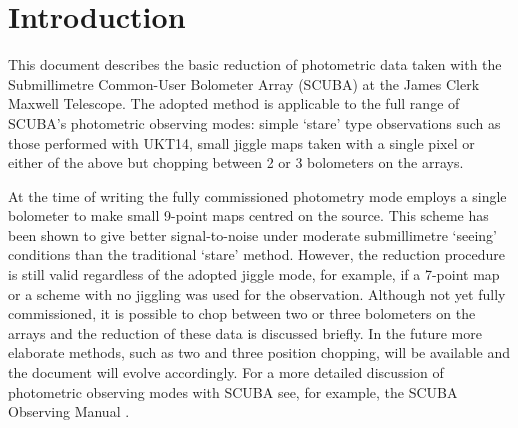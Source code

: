 \documentclass[twoside,11pt,fleqn]{article}
\newcommand{\stardocinitials}  {SC}
\newcommand{\stardocnumber}    {10.1}
\newcommand{\stardocabstract}  {[Text of abstract]}
\newcommand{\stardocname}{\stardocinitials /\stardocnumber}
\newcommand{\htmladdnormallink}[2]{#1}
\newenvironment{latexonly}{}{}
\newcommand{\latexonlytoc}[0]{\tableofcontents}
\renewcommand{\thepage}{\roman{page}}
\begin{document}
 \newpage
 \begin{latexonly}
   \setlength{\parskip}{0mm}
   \latexonlytoc
   \setlength{\parskip}{\medskipamount}
   \markboth{\stardocname}{\stardocname}
 \end{latexonly}
\cleardoublepage
\renewcommand{\thepage}{\arabic{page}}
\setcounter{page}{1}

\section{Introduction}

This document describes the basic reduction of photometric data taken with the
Submillimetre Common-User Bolometer Array (SCUBA) at the
\htmladdnormallink{James Clerk Maxwell
Telescope}{http://www.jach.hawaii.edu/JCMT/}. The adopted method is applicable
to the full range of SCUBA's photometric observing modes: simple `stare' type
observations such as those performed with UKT14, small jiggle maps taken with
a single pixel or either of the above but chopping between 2 or 3 bolometers
on the arrays.

At the time of writing the fully commissioned photometry mode employs
a single bolometer to make small 9-point maps centred on the
source. This scheme has been shown to give better signal-to-noise
under moderate submillimetre `seeing' conditions than the traditional
`stare' method.  However, the reduction procedure is still valid
regardless of the adopted jiggle mode, for example, if a 7-point map
or a scheme with no jiggling was used for the observation.  Although
not yet fully commissioned, it is possible to chop between two or
three bolometers on the arrays and the reduction of these data is
discussed briefly.  In the future more elaborate methods, such as two
and three position chopping, will be available and the document will
evolve accordingly.  For a more detailed discussion of photometric
observing modes with SCUBA see, for example, the 
\htmladdnormallink{SCUBA Observing
Manual}{http://www.jach.hawaii.edu/jcmt_sw/scuba/} 
\cite{obsguide}.
\end{document}
